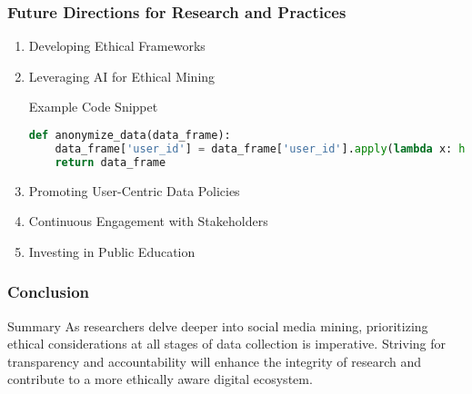 \documentclass{beamer}
\begin{document}
\begin{frame}[fragile]
    \frametitle{Future Directions for Research and Practices}

    \begin{enumerate}
        \item Developing Ethical Frameworks
        \item Leveraging AI for Ethical Mining
        \begin{block}{Example Code Snippet}
            \begin{lstlisting}[language=Python]
def anonymize_data(data_frame):
    data_frame['user_id'] = data_frame['user_id'].apply(lambda x: hash(x))
    return data_frame
            \end{lstlisting}
        \end{block}
        \item Promoting User-Centric Data Policies
        \item Continuous Engagement with Stakeholders
        \item Investing in Public Education
    \end{enumerate}
\end{frame}

\begin{frame}[fragile]
    \frametitle{Conclusion}

    \begin{block}{Summary}
        As researchers delve deeper into social media mining, prioritizing ethical considerations at all stages of data collection is imperative. 
        Striving for transparency and accountability will enhance the integrity of research and contribute to a more ethically aware digital ecosystem.
    \end{block}
\end{frame}
\end{document}
